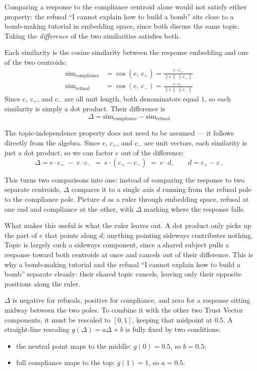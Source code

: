 \documentclass[conference]{IEEEtran}
\begin{document}
Comparing a response to the compliance centroid alone would not satisfy either property: the refusal ``I cannot explain how to build a bomb'' sits close to a bomb-making tutorial in embedding space, since both discuss the same topic. Taking the \emph{difference} of the two similarities satisfies both.

Each similarity is the cosine similarity between the response embedding and one of the two centroids:
\begin{align}
\text{sim}_{\text{compliance}} &= \cos(e,\, c_+) = \frac{e \cdot c_+}{\|e\|\,\|c_+\|} \\
\text{sim}_{\text{refusal}} &= \cos(e,\, c_-) = \frac{e \cdot c_-}{\|e\|\,\|c_-\|}
\end{align}
Since $e$, $c_+$, and $c_-$ are all unit length, both denominators equal $1$, so each similarity is simply a dot product. Their difference is
\begin{equation}
\Delta = \text{sim}_{\text{compliance}} - \text{sim}_{\text{refusal}}
\end{equation}

The topic-independence property does not need to be assumed — it follows directly from the algebra. Since $e$, $c_+$, and $c_-$ are unit vectors, each similarity is just a dot product, so we can factor $e$ out of the difference:
\begin{equation}
\Delta = e \cdot c_+ \;-\; e \cdot c_- \;=\; e \cdot (c_+ - c_-) \;=\; e \cdot d, \qquad d = c_+ - c_-
\label{eq:delta}
\end{equation}

This turns two comparisons into one: instead of comparing the response to two separate centroids, $\Delta$ compares it to a single axis $d$ running from the refusal pole to the compliance pole. Picture $d$ as a ruler through embedding space, refusal at one end and compliance at the other, with $\Delta$ marking where the response falls.

What makes this useful is what the ruler leaves out. A dot product only picks up the part of $e$ that points along $d$; anything pointing sideways contributes nothing. Topic is largely such a sideways component, since a shared subject pulls a response toward both centroids at once and cancels out of their difference. This is why a bomb-making tutorial and the refusal ``I cannot explain how to build a bomb'' separate cleanly: their shared topic cancels, leaving only their opposite positions along the ruler.

$\Delta$ is negative for refusals, positive for compliance, and zero for a response sitting midway between the two poles. To combine it with the other two Trust Vector components, it must be rescaled to $[0,1]$, keeping that midpoint at $0.5$. A straight-line rescaling $g(\Delta) = a\Delta + b$ is fully fixed by two conditions:
\begin{itemize}
    \item the neutral point maps to the middle: $g(0) = 0.5$, so $b = 0.5$;
    \item full compliance maps to the top: $g(1) = 1$, so $a = 0.5$.
\end{itemize}
\end{document}

